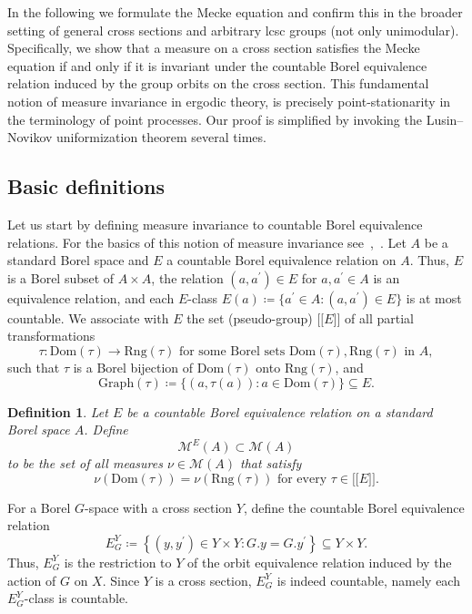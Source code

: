 \documentclass{amsart}
\numberwithin{equation}{subsection}
\newtheorem{defn}[thm]{Definition}
\theoremstyle{remark}
\begin{document}
In the following we formulate the Mecke equation and confirm this in the broader setting of general cross sections and arbitrary lcsc groups (not only unimodular). Specifically, we show that a measure on a cross section satisfies the Mecke equation if and only if it is invariant under the countable Borel equivalence relation induced by the group orbits on the cross section. This fundamental notion of measure invariance in ergodic theory, is precisely point-stationarity in the terminology of point processes. Our proof is simplified by invoking the Lusin--Novikov uniformization theorem several times.

\subsection{Basic definitions}

Let us start by defining measure invariance to countable Borel equivalence relations. For the basics of this notion of measure invariance see~\cite[\S8]{kechris2004topics},~\cite[\S4.2 \& 4.7]{Kechris2024}. Let \(A\) be a standard Borel space and \(E\) a countable Borel equivalence relation on \(A\). Thus, \(E\) is a Borel subset of \(A\times A\), the relation \(\left(a,a^{\prime}\right)\in E\) for \(a,a^{\prime}\in A\) is an equivalence relation, and each \(E\)-class \(E\left(a\right)\coloneqq\{a^{\prime}\in A:\left(a,a^{\prime}\right)\in E\}\) is at most countable. We associate with \(E\) the set (pseudo-group)  \(\bigl[\!\bigl[E\bigr]\!\bigr]\) of all partial transformations
\[\tau:\mathrm{Dom}\left(\tau\right)\longrightarrow\mathrm{Rng}\left(\tau\right)\text{ for some Borel sets }\mathrm{Dom}\left(\tau\right),\mathrm{Rng}\left(\tau\right)\text{ in }A,\]
such that \(\tau\) is a Borel bijection of \(\mathrm{Dom}\left(\tau\right)\) onto \(\mathrm{Rng}\left(\tau\right)\), and
\[\mathrm{Graph}\left(\tau\right)\coloneqq\{\left(a,\tau\left(a\right)\right):a\in\mathrm{Dom}\left(\tau\right)\}\subseteq E.\]

\begin{defn}\label{dfn:invcber}
Let \(E\) be a countable Borel equivalence relation on a standard Borel space \(A\). Define
\[\mathcal{M}^{E}\left(A\right)\subset\mathcal{M}\left(A\right)\]
to be the set of all measures \(\nu\in\mathcal{M}\left(A\right)\) that satisfy
\[\nu\left(\mathrm{Dom}\left(\tau\right)\right)=\nu\left(\mathrm{Rng}\left(\tau\right)\right)\text{ for every }\tau\in\bigl[\!\bigl[E\bigr]\!\bigr].\]
\end{defn}

For a Borel \(G\)-space with a cross section \(Y\), define the countable Borel equivalence relation
\[E_{G}^{Y}\coloneqq \left\{\left(y,y^{\prime}\right)\in Y\times Y: G.y=G.y^{\prime}\right\}\subseteq Y\times Y.\]
Thus, \(E_{G}^{Y}\) is the restriction to \(Y\) of the orbit equivalence relation induced by the action of \(G\) on \(X\). Since \(Y\) is a cross section, \(E_{G}^{Y}\) is indeed countable, namely each \(E_{G}^{Y}\)-class is countable.
\end{document}
